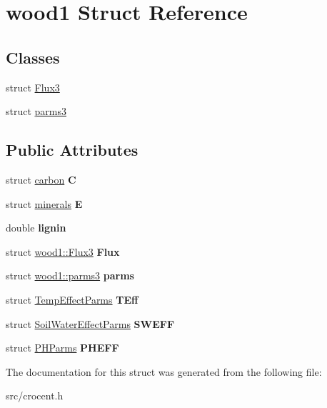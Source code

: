 \hypertarget{structwood1}{\section{wood1 Struct Reference}
\label{structwood1}
}
\subsection*{Classes}
\begin{DoxyCompactItemize}
\item 
struct \hyperlink{structwood1_1_1_flux3}{Flux3}
\item 
struct \hyperlink{structwood1_1_1parms3}{parms3}
\end{DoxyCompactItemize}
\subsection*{Public Attributes}
\begin{DoxyCompactItemize}
\item 
\hypertarget{structwood1_a7c05a219c63c6651a7d234f65f68dc78}{struct \hyperlink{structcarbon}{carbon} {\bfseries C}}\label{structwood1_a7c05a219c63c6651a7d234f65f68dc78}

\item 
\hypertarget{structwood1_afdeefd08faa11525e4dbdcf33f8bf225}{struct \hyperlink{structminerals}{minerals} {\bfseries E}}\label{structwood1_afdeefd08faa11525e4dbdcf33f8bf225}

\item 
\hypertarget{structwood1_a7a4675ff0ebe5b47e3a793fd101530f6}{double {\bfseries lignin}}\label{structwood1_a7a4675ff0ebe5b47e3a793fd101530f6}

\item 
\hypertarget{structwood1_a063782cb5f1c7fb686b118551044538c}{struct \hyperlink{structwood1_1_1_flux3}{wood1\-::\-Flux3} {\bfseries Flux}}\label{structwood1_a063782cb5f1c7fb686b118551044538c}

\item 
\hypertarget{structwood1_a6babff3eafb2f24b76c3fa7a94984f5b}{struct \hyperlink{structwood1_1_1parms3}{wood1\-::parms3} {\bfseries parms}}\label{structwood1_a6babff3eafb2f24b76c3fa7a94984f5b}

\item 
\hypertarget{structwood1_ac368fb73a249c80797f04f82c2b3fdd7}{struct \hyperlink{struct_temp_effect_parms}{Temp\-Effect\-Parms} {\bfseries T\-Eff}}\label{structwood1_ac368fb73a249c80797f04f82c2b3fdd7}

\item 
\hypertarget{structwood1_a624ea4b01dd238b5281b59282bfec567}{struct \hyperlink{struct_soil_water_effect_parms}{Soil\-Water\-Effect\-Parms} {\bfseries S\-W\-E\-F\-F}}\label{structwood1_a624ea4b01dd238b5281b59282bfec567}

\item 
\hypertarget{structwood1_ab35fb8fbfa52930d28f5b9be057baf13}{struct \hyperlink{struct_p_h_parms}{P\-H\-Parms} {\bfseries P\-H\-E\-F\-F}}\label{structwood1_ab35fb8fbfa52930d28f5b9be057baf13}

\end{DoxyCompactItemize}


The documentation for this struct was generated from the following file\-:\begin{DoxyCompactItemize}
\item 
src/crocent.\-h\end{DoxyCompactItemize}
